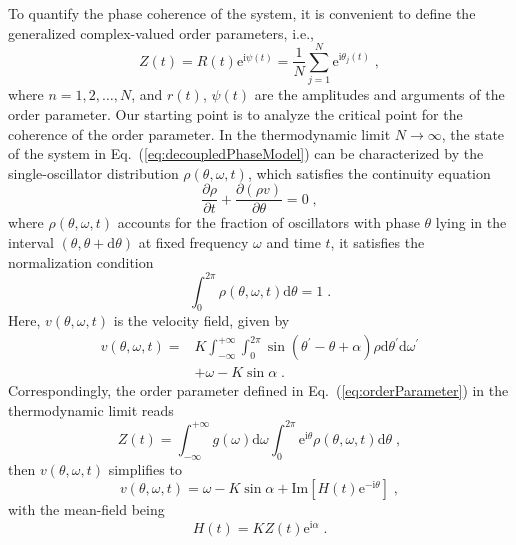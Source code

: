 \documentclass{article}
\begin{document}
To quantify the phase coherence of the system, it is convenient to define the generalized complex-valued order parameters, i.e.,
\begin{equation}
    \label{eq:orderParameter}
    Z\left( t \right) =R\left( t \right) \text{e}^{\text{i}\psi\left( t \right)}=\frac{1}{N}\sum_{j=1}^N{\text{e}^{\text{i}\theta _{j}\left( t \right)}}\;,
\end{equation}
where $n=1,2,\dots, N$, and $r\left( t \right)$, $\psi \left( t \right)$ are the amplitudes and arguments of the order parameter.
Our starting point is to analyze the critical point for the coherence of the order parameter.
In the thermodynamic limit $N\to \infty$, the state of the system in Eq.~(\ref{eq:decoupledPhaseModel}) can be characterized by the single-oscillator distribution $\rho\left( \theta ,\omega, t \right)$, which satisfies the continuity equation
\begin{equation}
    \frac{\partial \rho}{\partial t}+\frac{\partial \left( \rho v \right)}{\partial \theta}=0\;,
    \label{eq:continuityEquation}
\end{equation}
where $\rho \left( \theta ,\omega ,t \right)$ accounts for the fraction of oscillators with phase $\theta$ lying in the interval $\left( \theta ,\theta +\mathrm{d}\theta \right)$ at fixed frequency $\omega$ and time $t$, it satisfies the normalization condition
\begin{equation}
    \label{eq:normalization}
    \int_{0}^{2\pi}{\rho \left( \theta ,\omega ,t \right) \text{d}\theta} =1\;.
\end{equation}
Here, $v\left( \theta ,\omega ,t \right)$ is the velocity field, given by
\begin{equation}
    \begin{aligned}
        v\left( \theta ,\omega ,t \right) =&K\int_{-\infty}^{+\infty}{\int_0^{2\pi}{\sin \left( \theta ^{\prime}-\theta +\alpha \right) \rho \mathrm{d}\theta ^{\prime}\mathrm{d}\omega ^{\prime}}}\\
        &+\omega -K\sin \alpha \;.
    \end{aligned} 
\end{equation}
Correspondingly, the order parameter defined in Eq.~(\ref{eq:orderParameter}) in the thermodynamic limit reads
\begin{equation}
    Z\left( t \right) =\int_{-\infty}^{+\infty}{g\left(\omega\right)\mathrm{d}\omega \int_0^{2\pi}{\mathrm{e}^{\mathrm{i}\theta}\rho \left( \theta ,\omega ,t \right) \mathrm{d}\theta }} \;,
    \label{eq:orderParameterContinuum}
\end{equation}
then $v\left( \theta ,\omega ,t \right)$ simplifies to
\begin{equation}
    v\left( \theta ,\omega ,t \right) =\omega -K\sin \alpha +\mathrm{Im}\left[ H\left( t \right) \mathrm{e}^{-\mathrm{i}\theta} \right] \;,
    \label{eq:velocityField}
\end{equation}
with the mean-field being
\begin{equation}
    H\left( t \right) =KZ\left( t \right) \mathrm{e}^{\mathrm{i}\alpha} \;.
\end{equation}
\end{document}
